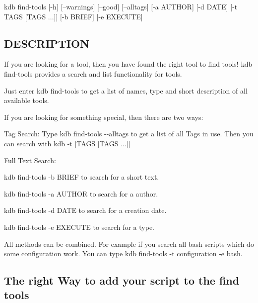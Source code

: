 {\ttfamily kdb find-\/tools} \mbox{[}-\/h\mbox{]} \mbox{[}--warnings\mbox{]} \mbox{[}--good\mbox{]} \mbox{[}--alltags\mbox{]} \mbox{[}-\/a A\+U\+T\+H\+O\+R\mbox{]} \mbox{[}-\/d D\+A\+T\+E\mbox{]} \mbox{[}-\/t T\+A\+G\+S \mbox{[}T\+A\+G\+S ...\mbox{]}\mbox{]} \mbox{[}-\/b B\+R\+I\+E\+F\mbox{]} \mbox{[}-\/e E\+X\+E\+C\+U\+T\+E\mbox{]}

\subsection*{D\+E\+S\+C\+R\+I\+P\+T\+I\+O\+N}

If you are looking for a tool, then you have found the right tool to find tools! {\ttfamily kdb find-\/tools} provides a search and list functionality for tools.

Just enter {\ttfamily kdb find-\/tools} to get a list of names, type and short description of all available tools.

If you are looking for something special, then there are two ways\+:


\begin{DoxyEnumerate}
\item Tag Search\+: Type {\ttfamily kdb find-\/tools -\/-\/alltags} to get a list of all Tags in use. Then you can search with {\ttfamily kdb -\/t \mbox{[}T\+A\+G\+S \mbox{[}T\+A\+G\+S ...\mbox{]}\mbox{]}}
\item Full Text Search\+:
\begin{DoxyItemize}
\item {\ttfamily kdb find-\/tools -\/b B\+R\+I\+E\+F} to search for a short text.
\item {\ttfamily kdb find-\/tools -\/a A\+U\+T\+H\+O\+R} to search for a author.
\item {\ttfamily kdb find-\/tools -\/d D\+A\+T\+E} to search for a creation date.
\item {\ttfamily kdb find-\/tools -\/e E\+X\+E\+C\+U\+T\+E} to search for a type.
\end{DoxyItemize}
\end{DoxyEnumerate}

All methods can be combined. For example if you search all bash scripts which do some configuration work. You can type {\ttfamily kdb find-\/tools -\/t configuration -\/e bash}.

\subsection*{The right Way to add your script to the find tools}

